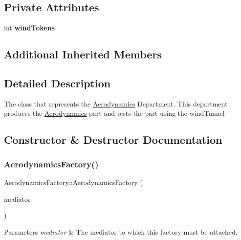 \subsection*{Private Attributes}
\begin{DoxyCompactItemize}
\item 
\mbox{\label{classAerodynamicsFactory_abf6b57457735cfc29c3910bcb3c3299e}} 
int {\bfseries wind\+Tokens}
\end{DoxyCompactItemize}
\subsection*{Additional Inherited Members}


\subsection{Detailed Description}
The class that represents the \hyperlink{classAerodynamics}{Aerodynamics} Department. This department produces the \hyperlink{classAerodynamics}{Aerodynamics} part and tests the part using the wind\+Tunnel 

\subsection{Constructor \& Destructor Documentation}
\mbox{\label{classAerodynamicsFactory_a46f12bf52bad9b98d19f6dcd3a04c384}} 
\subsubsection{\texorpdfstring{Aerodynamics\+Factory()}{AerodynamicsFactory()}}
{\footnotesize\ttfamily Aerodynamics\+Factory\+::\+Aerodynamics\+Factory (\begin{DoxyParamCaption}\item[{\hyperlink{classDepartmentMediator}{Department\+Mediator} $\ast$}]{mediator }\end{DoxyParamCaption})}


\begin{DoxyParams}{Parameters}
{\em mediator} & The mediator to which this factory must be attached. \\
\hline
\end{DoxyParams}


